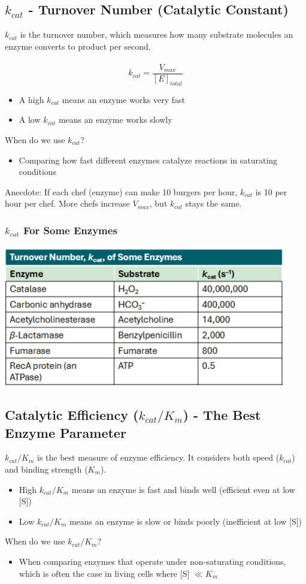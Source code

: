 \documentclass[10pt]{article}
\begin{document}
\subsection*{$k_{cat}$ - Turnover Number (Catalytic Constant)}
$k_{cat}$ is the turnover number, which measures how many substrate molecules an enzyme converts to product per second.\\\\
\[k_{cat} = \frac{V_{max}}{[E]_{total}}\]
\begin{itemize}
    \item A high $k_{cat}$ means an enzyme works very fast
    \item A low $k_{cat}$ means an enzyme works slowly
\end{itemize}
When do we use $k_{cat}$?
\begin{itemize}
    \item Comparing how fast different enzymes catalyze reactions in saturating conditions
\end{itemize}
Anecdote: If each chef (enzyme) can make 10 burgers per hour, $k_{cat}$ is 10 per hour per chef.  More chefs increase $V_{max}$, but $k_{cat}$ stays the same.

\subsubsection*{$k_{cat}$ For Some Enzymes}
\begin{center}
    \includegraphics*[scale=1]{L1_9.png}
\end{center}

\subsection*{Catalytic Efficiency ($k_{cat} / K_m$) - The Best Enzyme Parameter}
$k_{cat} / K_m$ is the best measure of enzyme efficiency.  It considers both speed ($k_{cat}$) and binding strength ($K_m$).
\begin{itemize}
    \item High $k_{cat} / K_m$ means an enzyme is fast and binds well (efficient even at low [S])
    \item Low $k_{cat} / K_m$ means an enzyme is slow or binds poorly (inefficient at low [S])
\end{itemize}
When do we use $k_{cat} / K_m$?
\begin{itemize}
    \item When comparing enzymes that operate under non-saturating conditions, which is often the case in living cells where [S] $\ll K_m$ 
\end{itemize}
\end{document}
